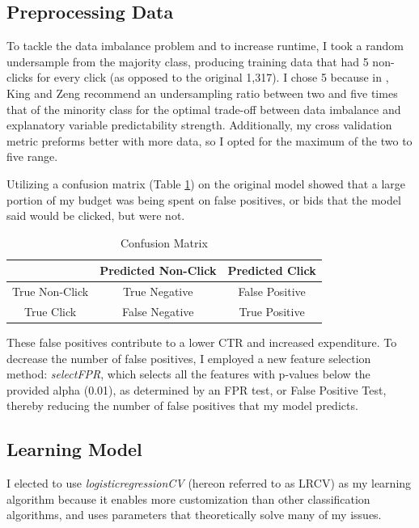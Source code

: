 \documentclass{sig-alternate-05-2015}
\begin{document}
\subsection{Preprocessing Data}
To tackle the data imbalance problem and to increase runtime, I took a random undersample from the majority class, producing training data that had 5 non-clicks for every click (as opposed to the original 1,317).  I chose 5 because in \cite{zeroMult}, King and Zeng recommend an undersampling ratio between two and five times that of the minority class for the optimal trade-off between data imbalance and explanatory variable predictability strength. Additionally, my cross validation metric preforms better with more data, so I opted for the maximum of the two to five range.

Utilizing a confusion matrix (Table \ref{confusionMatrix}) on the original model showed that a large portion of my budget was being spent on false positives, or bids that the model said would be clicked, but were not.

\begin{table}[h!]
\centering
\begin{tabular}{ | c | c | c |}
 \hline
 & Predicted Non-Click & Predicted Click \\
 \hline
 True Non-Click & True Negative & False Positive \\
 \hline
 True Click & False Negative & True Positive \\
 \hline
\end{tabular}
\caption{Confusion Matrix}
\label{confusionMatrix}
\end{table}

These false positives contribute to a lower CTR and increased expenditure.  To decrease the number of false positives, I employed a new feature selection method: \textit{selectFPR}, which selects all the features with p-values below the provided alpha (0.01), as determined by an FPR test, or False Positive Test, thereby reducing the number of false positives that my model predicts.

\subsection{Learning Model}
I elected to use \textit{logisticregressionCV} (hereon referred to as LRCV) as my learning algorithm because it enables more customization than other classification algorithms, and uses parameters that theoretically solve many of my issues.
\end{document}
